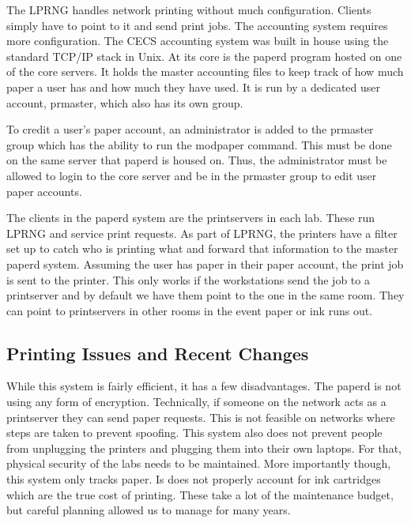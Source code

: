 The LPRNG handles network printing without much configuration.  Clients simply have to point to it and send print jobs.  The accounting system requires more configuration.  The CECS accounting system was built in house using the standard TCP/IP stack in Unix.  At its core is the paperd program hosted on one of the core servers.  It holds the master accounting files to keep track of how much paper a user has and how much they have used.  It is run by a dedicated user account, prmaster, which also has its own group.  

To credit a user's paper account, an administrator is added to the prmaster group which has the ability to run the modpaper command.  This must be done on the same server that paperd is housed on.  Thus, the administrator must be allowed to login to the core server and be in the prmaster group to edit user paper accounts.  

The clients in the paperd system are the printservers in each lab.  These run LPRNG and service print requests.  As part of LPRNG, the printers have a filter set up to catch who is printing what and forward that information to the master paperd system.  Assuming the user has paper in their paper account, the print job is sent to the printer. This only works if the workstations send the job to a printserver and by default we have them point to the one in the same room. They can point to printservers in other rooms in the event paper or ink runs out. 

\subsection{Printing Issues and Recent Changes}
While this system is fairly efficient, it has a few disadvantages.  The paperd is not using any form of encryption.  Technically, if someone on the network acts as a printserver they can send paper requests.  This is not feasible on networks where steps are taken to prevent spoofing.  This system also does not prevent people from unplugging the printers and plugging them into their own laptops.  For that, physical security of the labs needs to be maintained.  More importantly though, this system only tracks paper.  Is does not properly account for ink cartridges which are the true cost of printing.  These take a lot of the maintenance budget, but careful planning allowed us to manage for many years.  

